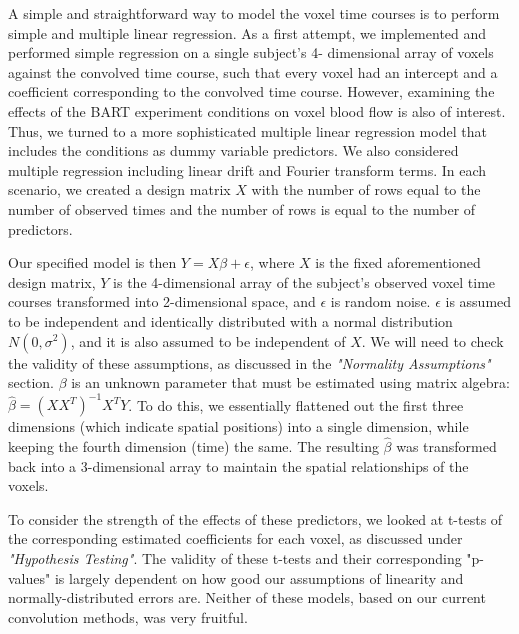\par \indent A simple and straightforward way to model the voxel time courses 
is to perform simple and multiple linear regression. As a first attempt, we 
implemented and performed simple regression on a single subject's 4-
dimensional array of voxels against the convolved time course, such that 
every voxel had an intercept and a coefficient corresponding to the convolved 
time course. However, examining the effects of the BART experiment conditions 
on voxel blood flow is also of interest. Thus, we turned to a more 
sophisticated multiple linear regression model that includes the conditions 
as dummy variable predictors. We also considered multiple regression including 
linear drift and Fourier transform terms. In each scenario, we created a 
design matrix $X$ with the number of rows equal to the number of observed 
times and the number of rows is equal to the number of predictors. 

Our specified model is then $Y = X\beta + \epsilon$, where $X$ is the fixed 
aforementioned design matrix, $Y$ is the 4-dimensional array of the subject's 
observed voxel time courses transformed into 2-dimensional space, and $\epsilon$ 
is random noise. $\epsilon$ is assumed to be independent and identically 
distributed with a normal distribution $N(0, \sigma^2)$, and it is also assumed 
to be independent of $X$. We will need to check the validity of these 
assumptions, as discussed in the \textit{"Normality Assumptions"} section. 
$\beta$ is an unknown parameter that must be estimated using matrix algebra: 
$\hat{\beta} = (X X^T)^{-1} X^T Y$. To do this, we essentially flattened out the 
first three dimensions (which indicate spatial positions) into a single dimension, 
while keeping the fourth dimension (time) the same. The resulting $\hat{\beta}$ 
was transformed back into a 3-dimensional array to maintain the spatial 
relationships of the voxels. 

\par To consider the strength of the effects of these predictors, we looked 
at t-tests of the corresponding estimated coefficients for each voxel, as 
discussed under \textit{"Hypothesis Testing"}. The validity of these t-tests and 
their corresponding "p-values" is largely dependent on how good our assumptions 
of linearity and normally-distributed errors are. Neither of these models, based 
on our current convolution methods, was very fruitful. 

